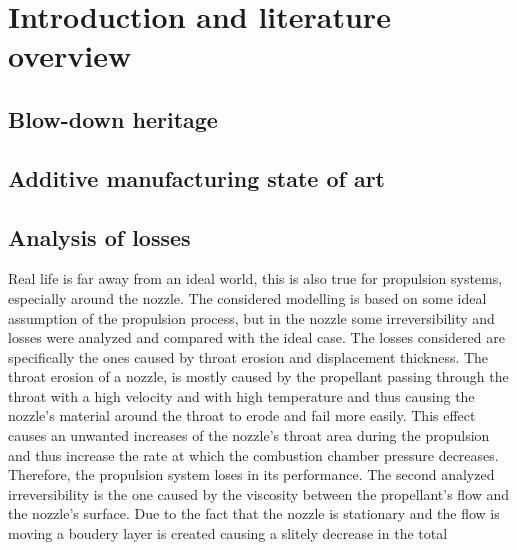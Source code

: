 \section{Introduction and literature overview}
\label{sec:introduction}

\subsection{Blow-down heritage}
\label{subsec:blowdown_intro}

\subsection{Additive manufacturing state of art}
\label{subsec:additive_intro}



\subsection{Analysis of losses}
\label{subsec:losses_intro}
Real life is far away from an ideal world, this is also true for propulsion systems, especially around the nozzle. The considered modelling is based on some ideal assumption of the propulsion process, but in the nozzle some irreversibility and losses were analyzed and compared with the ideal case. The losses considered are specifically the ones caused by throat erosion and displacement thickness. The throat erosion of a nozzle, is mostly caused by the propellant passing through the throat with a high velocity and with high temperature and thus causing the nozzle's material around the throat to erode and fail more easily. This effect causes an unwanted increases of the nozzle's throat area during the propulsion and thus increase the rate at which the combustion chamber pressure decreases. Therefore, the propulsion system loses in its performance. The second analyzed irreversibility is the one caused by the viscosity between the propellant's flow and the nozzle's surface. Due to the fact that the nozzle is stationary and the flow is moving a boudery layer is created causing a slitely decrease in the total       

